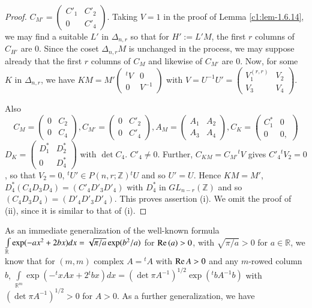 \begin{proof}
$C_{M'}=\left(\begin{smallmatrix} C'_{1} & C'_{2}\\ 0 & C'_{4}
\end{smallmatrix}\right)$. Taking $V=1$ in the proof of Lemma
\ref{c1:lem-1.6.14}, we may find a suitable $L'$ in $\Delta_{n,r}$ so
that for $H':=L'M$, the first $r$ columns of $C_{H'}$ are $0$. Since
the coset $\Delta_{n,r}M$ is unchanged in the process, we may suppose
already that the first $r$ columns of $C_{M}$ and likewise of $C_{M'}$
are $0$. Now, for some $K$ in $\Delta_{n,r}$, we have
$KM=M'\left(\begin{smallmatrix} {}^{t}V & 0\\ 0 & V^{-1}
\end{smallmatrix}\right)$ with $V=U^{-1}U'=\left(\begin{smallmatrix}
  V_{1}^{(r,r)} & V_{2}\\ V_{3} & V_{4}
\end{smallmatrix}\right)$. 

Also\pageoriginale
$$
C_{M}=
\begin{pmatrix}
0 & C_{2}\\
0 & C_{4}
\end{pmatrix},
C_{M'}=
\begin{pmatrix}
0 & C'_{2}\\
0 & C'_{4}
\end{pmatrix},
A_{M}=
\begin{pmatrix}
A_{1} & A_{2}\\
A_{3} & A_{4}
\end{pmatrix},
C_{K}=
\begin{pmatrix}
C^{\ast}_{1} & 0\\
0 & 0,
\end{pmatrix}
$$
$D_{K}=\left(\begin{smallmatrix} D^{\ast}_{1} & D^{\ast}_{2}\\ 0 &
  D^{\ast}_{4}
\end{smallmatrix}\right)$ with $\det C_{4}$. $C'_{4}\neq 0$. Further,
$C_{KM}=C_{M'}{}^{t}V$ gives $C'_{4}{}^{t}V_{2}=0$, so that $V_{2}=0$,
${}^{t}U'\in P(n,r;\mathbb{Z}){}^{t}U$ and so $U'=U$. Hence $KM=M'$,
$D^{\ast}_{4}(C_{4}D_{3}D_{4})=(C'_{4}D'_{3}D'_{4})$ with
$D^{\ast}_{4}$ in $GL_{n-r}(\mathbb{Z})$ and so
$(C_{4}D_{3}D_{4})=(D'_{4}D'_{3}D'_{4})$. This proves assertion
(i). We omit the proof of (ii), since it is similar to that of (i).
\end{proof}

As an immediate generalization of the well-known formula
$\int\limits_{\mathbb{R}}\exp\break(-ax^{2}+2bx)dx=\sqrt{\pi/a}\exp(b^{2}/a)$
for $\text{Re\,}(a)>0$, with $\sqrt{\pi/a}>0$ for $a\in\mathbb{R}$, we
know that for $(m,m)$ complex $A={}^{t}A$ with $\text{Re\,}A>0$ and
any $m$-rowed column $b$,
$\int\limits_{\mathbb{R}^{m}}\exp(-{}^{t}xAx+2{}^{t}bx)dx=(\det \pi
A^{-1})^{1/2}\exp({}^{t}bA^{-1}b)$ with $(\det \pi A^{-1})^{1/2}>0$
for $A>0$. As a further generalization, we have

